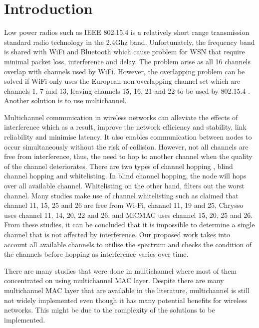 \section{Introduction}

Low power radios such as IEEE 802.15.4 is a relatively short range transmission standard radio technology in the 2.4Ghz band. Unfortunately, the frequency band is shared with WiFi and Bluetooth which cause problem for WSN that require minimal packet loss, interference and delay. The problem arise as all 16 channels overlap with channels used by WiFi. However, the overlapping problem can be solved if WiFi only uses the European non-overlapping channel set which are channels 1, 7 and 13, leaving channels 15, 16, 21 and 22 to be used by 802.15.4 \cite{ieee_2012}. Another solution is to use multichannel.

Multichannel communication in wireless networks can alleviate the effects of interference which as a result, improve the network efficiency and stability, link reliability and minimise latency. It also enables communication between nodes to occur simultaneously without the risk of collision. However, not all channels are free from interference, thus, the need to hop to another channel when the quality of the channel deteriorates. There are two types of channel hopping \cite{watteyne}, blind channel hopping and whitelisting. In blind channel hopping, the node will hops over all available channel. Whitelisting on the other hand, filters out the worst channel. Many studies make use of channel whitelisting such as \cite{watteyne} claimed that channel 11, 15, 25 and 26 are free from Wi-Fi, \cite{wu} channel 11, 19 and 25, Chrysso \cite{chrysso} uses channel 11, 14, 20, 22 and 26, and MiCMAC \cite{micmac} uses channel 15, 20, 25 and 26. From these studies, it can be concluded that it is impossible to determine a single channel that is not affected by interference. Our proposed work takes into account all available channels to utilise the spectrum and checks the condition of the channels before hopping as interference varies over time.


There are many studies that were done in multichannel where most of them concentrated on using multichannel MAC layer. Despite there are many multichannel MAC layer that are available in the literature, multichannel is still not widely implemented even though it has many potential benefits for wireless networks. This might be due to the complexity of the solutions to be implemented. 

